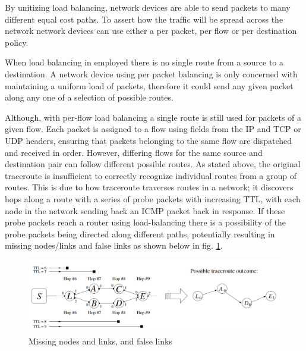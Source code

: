 By unitizing load balancing, network devices are able to send packets to many different equal cost paths. To assert how the traffic will be spread across the network network devices can use either a per packet, per flow or per destination policy. \cite{cisco}\cite{juniper} 

When load balancing in employed there is no single route from a source to a destination. A network device using per packet balancing is only concerned with maintaining a uniform load of packets, therefore it could send any given packet along any one of a selection of possible routes.\cite{anomalies}

Although, with per-flow load balancing a single route is still used for packets of a given flow. Each packet is assigned to a flow using fields from the IP and TCP or UDP headers, ensuring that packets belonging to the same flow are dispatched and received in order. However, differing flows for the same source and destination pair can follow different possible routes.\cite{anomalies} 
As stated above, the original traceroute is insufficient to correctly recognize individual routes from a group of routes. This is due to how traceroute traverses routes in a network; it discovers hops along a route with a series of probe packets with increasing TTL, with each node in the network sending back an ICMP packet back in response. If these probe packets reach a router using load-balancing there is a possibility of the probe packets being directed along different paths, potentially resulting in missing nodes/links and false links as shown below in fig. \ref{figure:missing_node_fig}.

\begin{figure}[!ht]
  \begin{center}
    \includegraphics[scale=0.3]{images/missing_nodes.png}
    \caption{Missing nodes and links, and false links \cite{anomalies}}
    \label{figure:missing_node_fig}
  \end{center}
\end{figure}


